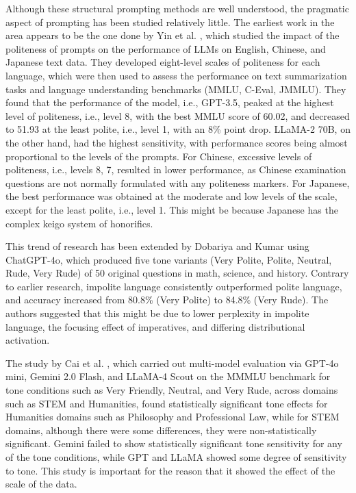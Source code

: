 \documentclass[conference]{IEEEtran}
\begin{document}
Although these structural prompting methods are well understood, the pragmatic aspect of prompting has been studied relatively little. The earliest work in the area appears to be the one done by Yin et al. \cite{b6}, which studied the impact of the politeness of prompts on the performance of LLMs on English, Chinese, and Japanese text data. They developed eight-level scales of politeness for each language, which were then used to assess the performance on text summarization tasks and language understanding benchmarks (MMLU, C-Eval, JMMLU). They found that the performance of the model, i.e., GPT-3.5, peaked at the highest level of politeness, i.e., level 8, with the best MMLU score of 60.02, and decreased to 51.93 at the least polite, i.e., level 1, with an 8\% point drop. LLaMA-2 70B, on the other hand, had the highest sensitivity, with performance scores being almost proportional to the levels of the prompts. For Chinese, excessive levels of politeness, i.e., levels 8, 7, resulted in lower performance, as Chinese examination questions are not normally formulated with any politeness markers. For Japanese, the best performance was obtained at the moderate and low levels of the scale, except for the least polite, i.e., level 1. This might be because Japanese has the complex keigo system of honorifics.

This trend of research has been extended by Dobariya and Kumar \cite{b7} using ChatGPT-4o, which produced five tone variants (Very Polite, Polite, Neutral, Rude, Very Rude) of 50 original questions in math, science, and history. Contrary to earlier research, impolite language consistently outperformed polite language, and accuracy increased from 80.8\% (Very Polite) to 84.8\% (Very Rude). The authors suggested that this might be due to lower perplexity in impolite language, the focusing effect of imperatives, and differing distributional activation.

The study by Cai et al. \cite{b8}, which carried out multi-model evaluation via GPT-4o mini, Gemini 2.0 Flash, and LLaMA-4 Scout on the MMMLU benchmark for tone conditions such as Very Friendly, Neutral, and Very Rude, across domains such as STEM and Humanities, found statistically significant tone effects for Humanities domains such as Philosophy and Professional Law, while for STEM domains, although there were some differences, they were non-statistically significant. Gemini failed to show statistically significant tone sensitivity for any of the tone conditions, while GPT and LLaMA showed some degree of sensitivity to tone. This study is important for the reason that it showed the effect of the scale of the data.
\end{document}
